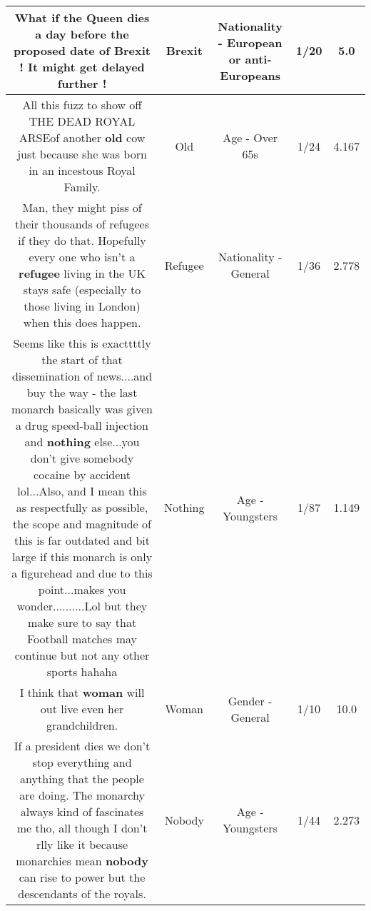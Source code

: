 \documentclass[11pt]{article}
\newlength\mylength
\begin{document}
\begin{center}
\begin{longtable}{|C{.65\mylength}|C{.30\mylength}|C{.12\mylength}|C{.12\mylength}|C{.12\mylength}|}
  \small What if the Queen dies a day before the proposed date of \textbf{Brexit} ! It might get delayed further !\normalsize   & Brexit & Nationality - European or anti-Europeans & 1/20 & 5.0 \\  \hline
  \small All this fuzz to show off THE DEAD ROYAL ARSEof another \textbf{old} cow just because she was born in an incestous Royal Family.\normalsize   & Old & Age - Over 65s & 1/24 & 4.167 \\  \hline
  \small Man, they might piss of their thousands of refugees if they do that. Hopefully every one who isn't a \textbf{refugee} living in the UK stays safe (especially to those living in London) when this does happen.\normalsize   & Refugee & Nationality - General & 1/36 & 2.778 \\  \hline
  \small Seems like this is exacttttly the start of that dissemination of news....and buy the way - the last monarch basically was given a drug speed-ball injection and \textbf{nothing} else...you don't give somebody cocaine by accident lol...Also, and I mean this as respectfully as possible, the scope and magnitude of this is far outdated and bit large if this monarch is only a figurehead and due to this point...makes you wonder..........Lol but they make sure to say that Football matches may continue but not any other sports hahaha\normalsize   & Nothing & Age - Youngsters & 1/87 & 1.149 \\  \hline
  \small I think that \textbf{woman} will out live even her grandchildren.\normalsize   & Woman & Gender - General & 1/10 & 10.0 \\  \hline
  \small If a president dies we don't stop everything and anything that the people are doing. The monarchy always kind of fascinates me tho, all though I don't rlly like it because monarchies mean \textbf{nobody} can rise to power but the descendants of the royals.\normalsize   & Nobody & Age - Youngsters & 1/44 & 2.273 \\  \hline

\end{longtable}
\end{center}
\end{document}
